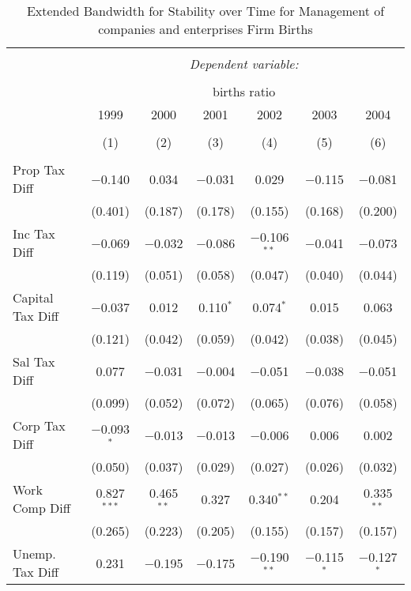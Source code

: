 
\begin{table}[!htbp] \centering 
  \caption{Extended Bandwidth for Stability over Time for  Management of companies and enterprises Firm Births} 
  \label{55 ebyear} 
\small 
\begin{tabular}{@{\extracolsep{5pt}}lcccccc} 
\\[-1.8ex]\hline 
\hline \\[-1.8ex] 
 & \multicolumn{6}{c}{\textit{Dependent variable:}} \\ 
\cline{2-7} 
\\[-1.8ex] & \multicolumn{6}{c}{births ratio} \\ 
 & 1999 & 2000 & 2001 & 2002 & 2003 & 2004 \\ 
\\[-1.8ex] & (1) & (2) & (3) & (4) & (5) & (6)\\ 
\hline \\[-1.8ex] 
 Prop Tax Diff & $-$0.140 & 0.034 & $-$0.031 & 0.029 & $-$0.115 & $-$0.081 \\ 
  & (0.401) & (0.187) & (0.178) & (0.155) & (0.168) & (0.200) \\ 
  Inc Tax Diff & $-$0.069 & $-$0.032 & $-$0.086 & $-$0.106$^{**}$ & $-$0.041 & $-$0.073 \\ 
  & (0.119) & (0.051) & (0.058) & (0.047) & (0.040) & (0.044) \\ 
  Capital Tax Diff & $-$0.037 & 0.012 & 0.110$^{*}$ & 0.074$^{*}$ & 0.015 & 0.063 \\ 
  & (0.121) & (0.042) & (0.059) & (0.042) & (0.038) & (0.045) \\ 
  Sal Tax Diff & 0.077 & $-$0.031 & $-$0.004 & $-$0.051 & $-$0.038 & $-$0.051 \\ 
  & (0.099) & (0.052) & (0.072) & (0.065) & (0.076) & (0.058) \\ 
  Corp Tax Diff & $-$0.093$^{*}$ & $-$0.013 & $-$0.013 & $-$0.006 & 0.006 & 0.002 \\ 
  & (0.050) & (0.037) & (0.029) & (0.027) & (0.026) & (0.032) \\ 
  Work Comp Diff & 0.827$^{***}$ & 0.465$^{**}$ & 0.327 & 0.340$^{**}$ & 0.204 & 0.335$^{**}$ \\ 
  & (0.265) & (0.223) & (0.205) & (0.155) & (0.157) & (0.157) \\ 
  Unemp. Tax Diff & 0.231 & $-$0.195 & $-$0.175 & $-$0.190$^{**}$ & $-$0.115$^{*}$ & $-$0.127$^{*}$ \\ 

\end{tabular}
\end{table}
